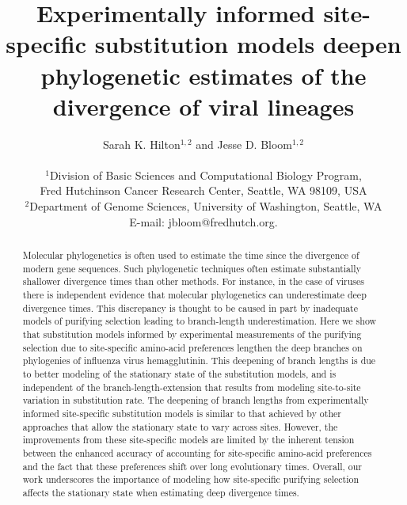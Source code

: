 \documentclass[11pt]{article}
\title{Experimentally informed site-specific substitution models deepen phylogenetic estimates of the divergence of viral lineages}
\author
{Sarah K. Hilton$^{1,2}$  and Jesse D. Bloom$^{1,2}$\\
\\
\normalsize{$^1$Division of Basic Sciences and Computational Biology Program,}\\
\normalsize{Fred Hutchinson Cancer Research Center, Seattle, WA 98109, USA}\\
\normalsize{$^2$Department of Genome Sciences, University of Washington, Seattle, WA}\\
\normalsize{E-mail:  jbloom@fredhutch.org.}\\
}
\date{}
\begin{document}
 


\maketitle 


\begin{abstract}
\noindent  
Molecular phylogenetics is often used to estimate the time since the divergence of modern gene sequences.
Such phylogenetic techniques often estimate substantially shallower divergence times than other methods.
For instance, in the case of viruses there is independent evidence that molecular phylogenetics can underestimate deep divergence times.  
This discrepancy is thought to be caused in part by inadequate models of purifying selection leading to branch-length underestimation.
Here we show that substitution models informed by experimental measurements of the purifying selection due to site-specific amino-acid preferences lengthen the deep branches on phylogenies of influenza virus hemagglutinin.
This deepening of branch lengths is due to better modeling of the stationary state of the substitution models, and is independent of the branch-length-extension that results from modeling site-to-site variation in substitution rate.
The deepening of branch lengths from experimentally informed site-specific substitution models is similar to that achieved by other approaches that allow the stationary state to vary across sites.
However, the improvements from these site-specific models are limited by the inherent tension between the enhanced accuracy of accounting for site-specific amino-acid preferences and the fact that these preferences shift over long evolutionary times.
Overall, our work underscores the importance of modeling how site-specific purifying selection affects the stationary state when estimating deep divergence times. 
\end{abstract}

\clearpage
\end{document}
